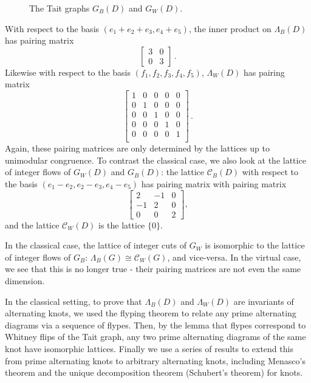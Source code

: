 \documentclass[12pt]{report}
\theoremstyle{upright}
\begin{document}
\begin{figure}[hbt]
	\centering
	\def\svgscale{0.4}
	
	\caption{The Tait graphs $G_{B}(D)$ and $G_{W}(D)$.}
	\label{fig:5-2429-taits-abstract}
\end{figure}

With respect to the basis $(e_{1} + e_{2} + e_{3}, e_{4} + e_{5})$, the inner product on $\Lambda_{B}(D)$ has pairing matrix
\[\begin{bmatrix}
3 & 0 \\
0 & 3
\end{bmatrix}\,.\]
Likewise with respect to the basis $(f_{1}, f_{2}, f_{3}, f_{4}, f_{5})$, $\Lambda_{W}(D)$ has pairing matrix
\[\begin{bmatrix}
1 & 0 & 0 & 0 & 0\\
0 & 1 & 0 & 0 & 0\\
0 & 0 & 1 & 0 & 0\\
0 & 0 & 0 & 1 & 0\\
0 & 0 & 0 & 0 & 1\\
\end{bmatrix}\,.\]
Again, these pairing matrices are only determined by the lattices up to unimodular congruence.
To contrast the classical case, we also look at the lattice of integer flows of $G_{W}(D)$ and $G_{B}(D)$: the lattice $\mathcal{C}_{B}(D)$ with respect to the basis $(e_{1} - e_{2}, e_{2} - e_{3}, e_{4} - e_{5})$ has pairing matrix
with pairing matrix
\[\begin{bmatrix}
	2  & -1 & 0 \\
	-1 & 2  & 0 \\
	0  & 0  & 2
\end{bmatrix},\]
and the lattice $\mathcal{C}_{W}(D)$ is the lattice $\{ 0 \}$.

In the classical case, the lattice of integer cuts of $G_{W}$ is isomorphic to the lattice of integer flows of $G_{B}$: $\Lambda_{B}(G) \cong \mathcal{C}_{W}(G)$, and vice-versa. In the virtual case, we see that this is no longer true - their pairing matrices are not even the same dimension.

In the classical setting, to prove that $\Lambda_{B}(D)$ and $\Lambda_{W}(D)$ are invariants of alternating knots, we used the flyping theorem to relate any prime alternating diagrams via a sequence of flypes. Then, by the lemma that flypes correspond to Whitney flips of the Tait graph, any two prime alternating diagrams of the same knot have isomorphic lattices. Finally we use a series of results to extend this from prime alternating knots to arbitrary alternating knots, including Menasco's theorem and the unique decomposition theorem (Schubert's theorem) for knots.
\end{document}
